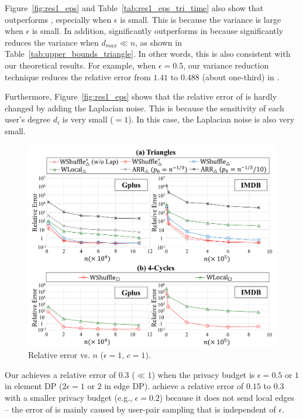 Figure~\ref{fig:res1_eps} and Table~\ref{tab:res1_eps_tri_time} also show that \AlgWSTriVR{} outperforms \AlgWSTri{}, especially when $\epsilon$ is small. 
This is because the variance is large when $\epsilon$ is small. 
In addition, \AlgWSTriVR{} significantly outperforms \AlgWSTri{} in \IMDB{} because \AlgWSTriVR{} significantly reduces the variance when $d_{max} \ll n$, as shown in Table~\ref{tab:upper_bounds_triangle}. 
In other words, this is also consistent with our theoretical results. 
For example, when $\epsilon=0.5$, our variance reduction technique reduces the relative error from $1.41$ to $0.488$ (about one-third) in \IMDB{}. 

Furthermore, Figure~\ref{fig:res1_eps} shows that the relative error of \AlgWSTriVR{} is hardly changed by adding the Laplacian noise. 
This is because the sensitivity of each user's degree $d_i$ is very small ($=1$). 
In this case, the Laplacian noise is also very small. 

\begin{figure}[t]
  \centering
  \includegraphics[width=0.99\linewidth]{fig/res2_n.pdf}
  \vspace{-4mm}
  \caption{Relative error vs. $n$ ($\epsilon=1$, $c=1$).
  }
  \label{fig:res2_n}
\end{figure}

Our \AlgWSTriVR{} achieves a relative error of $0.3$ ($\ll 1$) 
when the privacy budget is $\epsilon = 0.5$ or $1$ in element DP ($2\epsilon = 1$ or $2$ in edge DP). 
\AlgWSCyc{} achieve a relative error of $0.15$ to $0.3$ with a smaller privacy budget (e.g., $\epsilon = 0.2$) because it  does not send local edges -- the error of \AlgWSCyc{} is mainly caused by user-pair sampling that is independent of $\epsilon$. 

